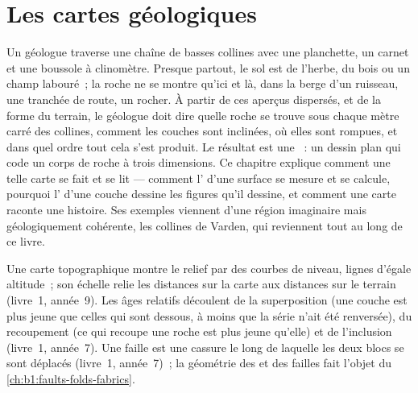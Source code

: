\chapter{Les cartes géologiques}\label{ch:b1:geological-maps}

Un géologue traverse une chaîne de basses collines avec une planchette, un
carnet et une boussole à clinomètre. Presque partout, le sol est de l'herbe, du
bois ou un champ labouré~; la roche ne se montre qu'ici et là, dans la berge
d'un ruisseau, une tranchée de route, un rocher. À partir de ces aperçus
dispersés, et de la forme du terrain, le géologue doit dire quelle roche se
trouve sous chaque mètre carré des collines, comment les couches sont
inclinées, où elles sont rompues, et dans quel ordre tout cela s'est produit.
Le résultat est une ~: un dessin plan qui code un corps de roche
à trois dimensions. Ce chapitre explique comment une telle carte se fait et se
lit --- comment l' d'une surface se mesure et se calcule, pourquoi
l' d'une couche dessine les figures qu'il dessine, et comment une
carte raconte une histoire. Ses exemples viennent d'une région imaginaire mais
géologiquement cohérente, les collines de Varden, qui reviennent tout au long de
ce livre.

\begin{recall}
Une carte topographique montre le relief par des courbes de niveau, lignes
d'égale altitude~; son échelle relie les distances sur la carte aux distances
sur le terrain (livre~1, année~9). Les âges relatifs découlent de la
superposition (une couche est plus jeune que celles qui sont dessous, à moins
que la série n'ait été renversée), du recoupement (ce qui recoupe une roche est
plus jeune qu'elle) et de l'inclusion (livre~1, année~7). Une faille est une
cassure le long de laquelle les deux blocs se sont déplacés (livre~1,
année~7)~; la géométrie des  et des failles fait l'objet du
\cref{ch:b1:faults-folds-fabrics}.
\end{recall}

